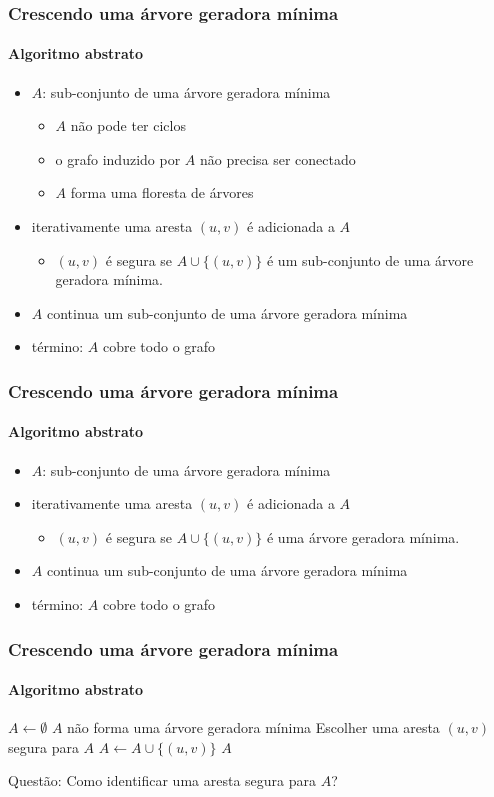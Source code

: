 \documentclass{beamer}
\begin{document}
\begin{frame}
\frametitle{Crescendo uma árvore geradora mínima}
\framesubtitle{Algoritmo abstrato}

\begin{itemize}
\item $A$: sub-conjunto de uma árvore geradora mínima
\begin{itemize}
\item $A$ não pode ter ciclos
\item o grafo induzido por $A$ não precisa ser conectado
\item $A$ forma uma floresta de árvores
\end{itemize}
\item iterativamente uma aresta $(u, v)$ é adicionada a $A$
\begin{itemize}
\item $(u, v)$ é \alert{segura} se $A \cup \{(u, v)\}$ é um sub-conjunto de uma árvore geradora mínima.
\end{itemize}
\item $A$ continua um sub-conjunto de uma árvore geradora mínima
\item término: $A$ cobre todo o grafo
\end{itemize}
\end{frame}

\begin{frame}
\frametitle{Crescendo uma árvore geradora mínima}
\framesubtitle{Algoritmo abstrato}

\begin{itemize}
\item $A$: sub-conjunto de uma árvore geradora mínima
\item iterativamente uma aresta $(u, v)$ é adicionada a $A$
\begin{itemize}
\item $(u, v)$ é \alert{segura} se $A \cup \{(u, v)\}$ é uma árvore geradora mínima.
\end{itemize}
\item $A$ continua um sub-conjunto de uma árvore geradora mínima
\item término: $A$ cobre todo o grafo
\end{itemize}
\end{frame}

\begin{frame}
\frametitle{Crescendo uma árvore geradora mínima}
\framesubtitle{Algoritmo abstrato}

\begin{codebox}
\zi $A \gets \emptyset$
\zi {}
\zi \While $A$ não forma uma árvore geradora mínima
\zi \Do Escolher uma aresta $(u, v)$ segura para $A$
\zi   $A \gets A \cup \{ (u, v) \}$
    \End
\zi \Return $A$
\end{codebox}
\pause
\alert{Questão:} Como identificar uma aresta segura para $A$?
\end{frame}
\end{document}
